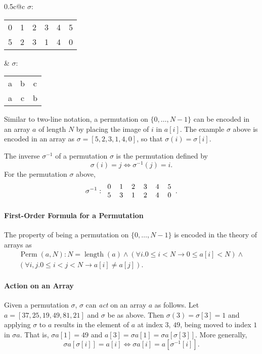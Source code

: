 \documentclass{llncs}
\DeclareMathOperator{\Perm}{Perm}
\DeclareMathOperator{\len}{length}
\begin{document}
\begin{center}
\begin{tabular*}{0.5\textwidth}{c@{\extracolsep{\fill}}c}
\(\sigma\):
\begin{tabular}{cccccc}
0 & 1 & 2 & 3 & 4 & 5\\
5 & 2 & 3 & 1 & 4 & 0
\end{tabular}
&
\(\sigma\):
\begin{tabular}{ccc}
a & b & c\\
a & c & b
\end{tabular}
\end{tabular*}
\end{center}

Similar to two-line notation, a permutation on \(\{0, \dotsc, N-1\}\) can be encoded in an array \(a\) of length \(N\) by placing the image of \(i\) in \(a[i]\).  The example \(\sigma\) above is encoded in an array as \(\sigma = [5, 2, 3, 1, 4, 0]\), so that \(\sigma(i) = \sigma[i]\).

The inverse \(\sigma^{-1}\) of a permutation \(\sigma\) is the permutation defined by
\[\sigma(i) = j \Longleftrightarrow \sigma^{-1}(j) = i.\]
For the permutation \(\sigma\) above,
\[\sigma^{-1}:\begin{tabular}{cccccc}
0 & 1 & 2 & 3 & 4 & 5\\
5 & 3 & 1 & 2 & 4 & 0
\end{tabular}.\]

\paragraph{First-Order Formula for a Permutation}
The property of being a permutation on \(\{0, \dotsc, N-1\}\) is encoded in the theory of arrays as
\begin{multline*}\Perm(a, N): N = \len(a) \wedge (\forall i. 0 \leq i < N \rightarrow 0 \leq a[i] < N) \wedge\\(\forall i,j. 0 \leq i < j < N \rightarrow a[i] \not= a[j]).\end{multline*}

\paragraph{Action on an Array}

Given a permutation \(\sigma\), \(\sigma\) can {\it act} on an array \(a\) as follows.  Let \(a = [37, 25, 19, 49, 81, 21]\) and \(\sigma\) be as above.  Then \(\sigma(3) = \sigma[3] = 1\) and applying \(\sigma\) to \(a\) results in the element of \(a\) at index \(3\), \(49\), being moved to index \(1\) in \(\sigma a\).  That is, \(\sigma a[1] = 49\) and \(a[3] = \sigma a[1] = \sigma a[\sigma[3]]\).  More generally,
\[\sigma a[\sigma[i]] = a[i] \Longleftrightarrow \sigma a[i] = a[\sigma^{-1}[i]].\]
\end{document}

